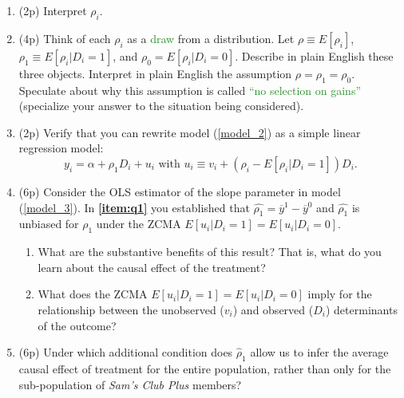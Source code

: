 \documentclass{article}
\begin{document}
\begin{enumerate}[label=\textbf{Q\arabic{enumi}}.,ref=Q\arabic{enumi}, wide=0pt, itemsep=1em, topsep=5pt]
    \begin{enumerate}
        \item (2p) Interpret $\rho _{i}$.
        \item (4p) Think of each $\rho _{i}$ as a \textcolor{ForestGreen}{draw} from a distribution. Let $\rho \equiv E\left[ \rho _{i}\right] $, $\rho_1 \equiv E\left[ \rho _{i}|D_{i}=1\right]$, and $\rho_0 = E\left[ \rho _{i}|D_{i}=0\right]$. Describe in plain English these three objects. Interpret in plain English the assumption $\rho=\rho_1=\rho_0 $. Speculate about why this assumption is called \textcolor{ForestGreen}{``no selection on gains''} (specialize your answer to the situation being considered).\label{item:q3-att}
        \item (2p) Verify that you can rewrite model (\ref{model_2}) as a simple linear regression model:
     \begin{equation}\label{model_3}
    y_{i}=\alpha +\rho_1 D_{i}+u_{i} \text{ with } u_i \equiv v_i+(\rho_i-E[\rho_i|D_i=1])D_i. 
    \end{equation}       
        \item (6p) Consider the OLS estimator of the slope parameter in model (\ref{model_3}). In \textbf{\ref{item:q1}} you established that $\widehat{\rho_1 }=\overline{y}^{1}-\overline{y}^{0}$ and $\widehat{\rho_1 }$ is unbiased for $\rho_1$ under the ZCMA $E[u_i|D_i=1]=E[u_i|D_i=0]$. 
        \begin{enumerate}
        \item What are the substantive benefits of this result? That is, what do you learn about the causal effect of the treatment?
        \item What does the ZCMA $E[u_i|D_i=1]=E[u_i|D_i=0]$ imply for the relationship between the unobserved ($v_i$) and observed ($D_i$) determinants of the outcome?
        \end{enumerate}

\item (6p) Under which additional condition does $\widehat{\rho}_1$ allow us to infer the average causal effect of treatment for the entire population, rather than only for the sub-population of \textit{Sam's Club Plus} members?

    \end{enumerate}
    
  

\end{enumerate}
\end{document}
